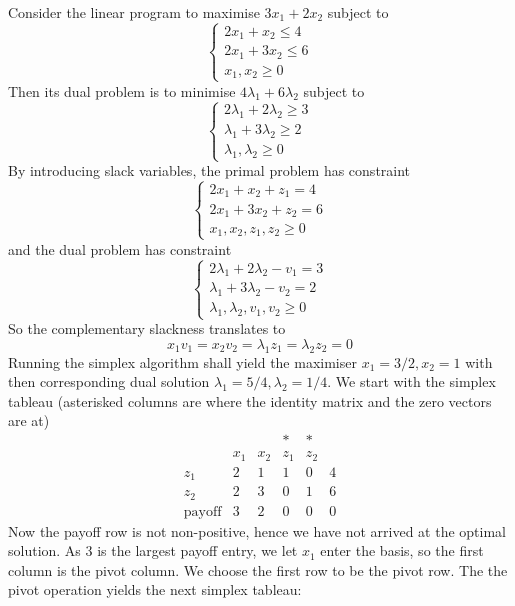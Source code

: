 \begin{example}
    Consider the linear program to maximise $3x_1+2x_2$ subject to
    $$\begin{cases}
        2x_1+x_2\le 4\\
        2x_1+3x_2\le 6\\
        x_1,x_2\ge 0
    \end{cases}$$
    Then its dual problem is to minimise $4\lambda_1+6\lambda_2$ subject to
    $$\begin{cases}
        2\lambda_1+2\lambda_2\ge 3\\
        \lambda_1+3\lambda_2\ge 2\\
        \lambda_1,\lambda_2\ge 0
    \end{cases}$$
    By introducing slack variables, the primal problem has constraint
    $$\begin{cases}
        2x_1+x_2+z_1=4\\
        2x_1+3x_2+z_2=6\\
        x_1,x_2,z_1,z_2\ge 0
    \end{cases}$$
    and the dual problem has constraint
    $$\begin{cases}
        2\lambda_1+2\lambda_2-v_1= 3\\
        \lambda_1+3\lambda_2-v_2= 2\\
        \lambda_1,\lambda_2,v_1,v_2\ge 0
    \end{cases}$$
    So the complementary slackness translates to
    $$x_1v_1=x_2v_2=\lambda_1z_1=\lambda_2z_2=0$$
    Running the simplex algorithm shall yield the maximiser $x_1=3/2,x_2=1$ with then corresponding dual solution $\lambda_1=5/4,\lambda_2=1/4$.
    We start with the simplex tableau (asterisked columns are where the identity matrix and the zero vectors are at)
    $$\begin{array}{c|cccc|c}
        &&&\ast&\ast&\\
        &x_1&x_2&z_1&z_2&\\ \hline
        z_1&2&1&1&0&4\\
        z_2&2&3&0&1&6\\ \hline
        \text{payoff}&3&2&0&0&0
    \end{array}$$
    Now the payoff row is not non-positive, hence we have not arrived at the optimal solution.
    As $3$ is the largest payoff entry, we let $x_1$ enter the basis, so the first column is the pivot column.
    We choose the first row to be the pivot row.
    The the pivot operation yields the next simplex tableau:
    $$\begin{array}{c|cccc|c}

\end{array}$$
\end{example}
